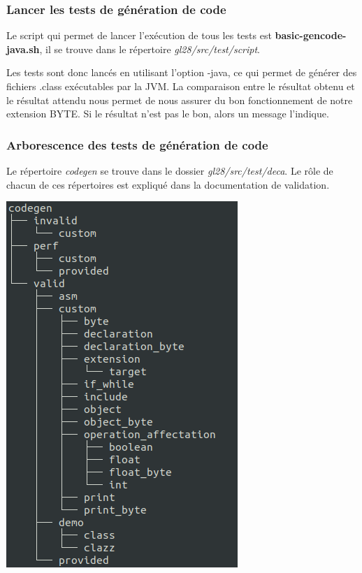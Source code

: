 \documentclass[12pt, a4paper, one side]{article}
\begin{document}
    \subsubsection{Lancer les tests de génération de code}
    Le script qui permet de lancer l'exécution de tous les tests est \textbf{basic-gencode-java.sh}, il se trouve dans le répertoire \textit{gl28/src/test/script}.
    \begin{flushleft}Les tests sont donc lancés en utilisant l'option -java, ce qui permet de générer des fichiers .class exécutables par la JVM. La comparaison entre le résultat obtenu et le résultat attendu nous permet de nous assurer du bon fonctionnement de notre extension BYTE. Si le résultat n'est pas le bon, alors un message l'indique.
    \end{flushleft}

    \subsubsection{Arborescence des tests de génération de code}
    Le répertoire \textit{codegen} se trouve dans le dossier \textit{gl28/src/test/deca}. Le rôle de chacun de ces répertoires est expliqué dans la documentation de validation.
    \begin{center}
        \includegraphics[scale=0.6]{treecodegen.png}
    \end{center}
\end{document}
